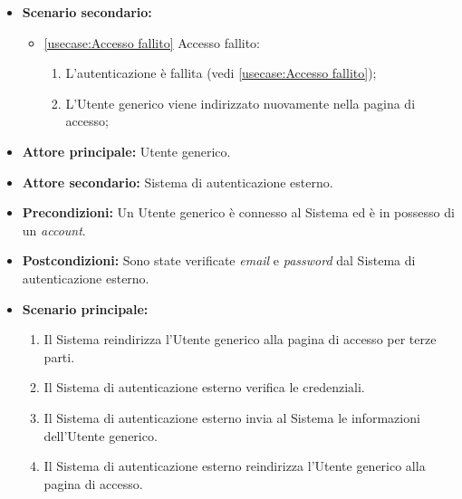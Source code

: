 \begin{itemize}
	\item \textbf{Scenario secondario:}
	\begin{itemize}
		\item \autoref{usecase:Accesso fallito} Accesso fallito:
		\begin{enumerate}
			\item L'autenticazione è fallita (vedi \autoref{usecase:Accesso fallito});
			\item L'Utente generico viene indirizzato nuovamente nella pagina di accesso; 
		\end{enumerate}	
	\end{itemize}

		

\end{itemize}

\label{usecase:Accesso per terze parti}
\begin{itemize}

	\item \textbf{Attore principale:} Utente generico.
	\item \textbf{Attore secondario:} Sistema di autenticazione esterno.

	\item \textbf{Precondizioni:} Un Utente generico è connesso al Sistema ed è in possesso di un \textit{account}.

	\item \textbf{Postcondizioni:} Sono state verificate \textit{email} e \textit{password} dal Sistema di autenticazione esterno.

	\item \textbf{Scenario principale:}
	\begin{enumerate}
		\item Il Sistema reindirizza l'Utente generico alla pagina di accesso per terze parti.
		\item Il Sistema di autenticazione esterno verifica le credenziali.
		\item Il Sistema di autenticazione esterno invia al Sistema le informazioni dell'Utente generico.
		\item Il Sistema di autenticazione esterno reindirizza l'Utente generico alla pagina di accesso. 
	\end{enumerate}
	
\end{itemize}

